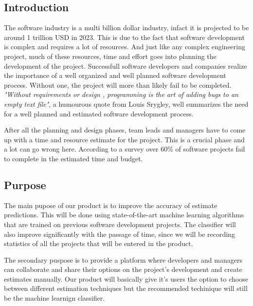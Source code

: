 \subsection{Introduction}
The software industry is a multi billion dollar industry, infact it is projected to be around 1 trillion USD in 2023. This is due to the fact that software development is complex and requires a lot of resources. And just like any complex engineering project, much of these resources, time and effort goes into planning the development of the project. Successfull software developers and companies realize the importance of a well organized and well planned software development process. Without one, the project will more than likely fail to be completed. {\it{"Without requirements or design , programming is the art of adding bugs to an empty text file"}}, a humourous quote from Louis Srygley, well summarizes the need for  a well planned and estimated software development process.
\vspace{2mm}

After all the planning and design phases, team leads and managers have to come up with a time and resource estimate for the project. This is a crucial phase and a lot can go wrong here. According to a survey over 60\% of software projects fail to complete in the estimated time and budget. 












\subsection{Purpose}
The main pupose of our product is to improve the accuracy of estimate predictions. This will be done using state-of-the-art machine learning algorithms that are trained on previous software development projects. The classifier will also improve significantly with the passage of time, since we will be recording statistics of all the projects that will be entered in the product. 

 The secondary puspose is to provide a platform where developers and managers can collaborate and share their options on the project's development and create estimates manually. Our product will basically give it's users the option to choose between different estimation techniques but the recommended techinique will still be the machine learnign classifier.












